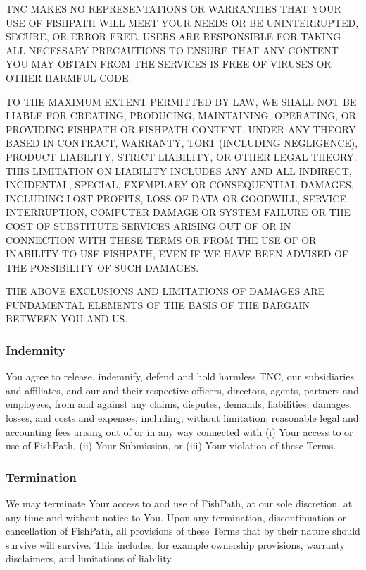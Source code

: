 \documentclass[11pt,]{book}
\begin{document}
TNC MAKES NO REPRESENTATIONS OR WARRANTIES THAT YOUR USE OF FISHPATH WILL MEET YOUR NEEDS OR BE UNINTERRUPTED, SECURE, OR ERROR FREE. USERS ARE RESPONSIBLE FOR TAKING ALL NECESSARY PRECAUTIONS TO ENSURE THAT ANY CONTENT YOU MAY OBTAIN FROM THE SERVICES IS FREE OF VIRUSES OR OTHER HARMFUL CODE.

TO THE MAXIMUM EXTENT PERMITTED BY LAW, WE SHALL NOT BE LIABLE FOR CREATING, PRODUCING, MAINTAINING, OPERATING, OR PROVIDING FISHPATH OR FISHPATH CONTENT, UNDER ANY THEORY BASED IN CONTRACT, WARRANTY, TORT (INCLUDING NEGLIGENCE), PRODUCT LIABILITY, STRICT LIABILITY, OR OTHER LEGAL THEORY. THIS LIMITATION ON LIABILITY INCLUDES ANY AND ALL INDIRECT, INCIDENTAL, SPECIAL, EXEMPLARY OR CONSEQUENTIAL DAMAGES, INCLUDING LOST PROFITS, LOSS OF DATA OR GOODWILL, SERVICE INTERRUPTION, COMPUTER DAMAGE OR SYSTEM FAILURE OR THE COST OF SUBSTITUTE SERVICES ARISING OUT OF OR IN CONNECTION WITH THESE TERMS OR FROM THE USE OF OR INABILITY TO USE FISHPATH, EVEN IF WE HAVE BEEN ADVISED OF THE POSSIBILITY OF SUCH DAMAGES.

THE ABOVE EXCLUSIONS AND LIMITATIONS OF DAMAGES ARE FUNDAMENTAL ELEMENTS OF THE BASIS OF THE BARGAIN BETWEEN YOU AND US.

\hypertarget{indemnity}{%
\subsubsection*{Indemnity}\label{indemnity}}

You agree to release, indemnify, defend and hold harmless TNC, our subsidiaries and affiliates, and our and their respective officers, directors, agents, partners and employees, from and against any claims, disputes, demands, liabilities, damages, losses, and costs and expenses, including, without limitation, reasonable legal and accounting fees arising out of or in any way connected with (i) Your access to or use of FishPath, (ii) Your Submission, or (iii) Your violation of these Terms.

\hypertarget{termination}{%
\subsubsection*{Termination}\label{termination}}

We may terminate Your access to and use of FishPath, at our sole discretion, at any time and without notice to You. Upon any termination, discontinuation or cancellation of FishPath, all provisions of these Terms that by their nature should survive will survive. This includes, for example ownership provisions, warranty disclaimers, and limitations of liability.
\end{document}

